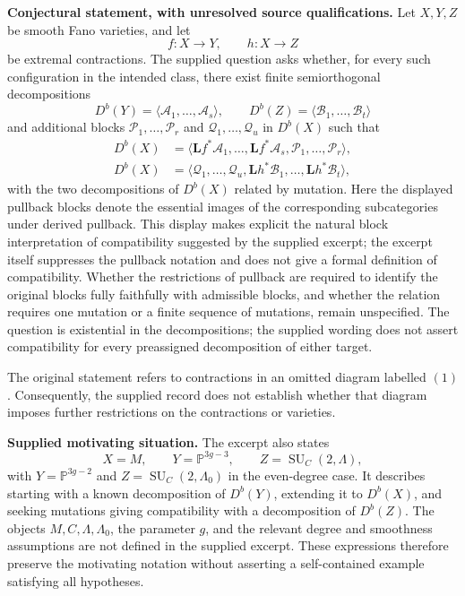 \documentclass[11pt]{article}
\begin{document}
\textbf{Conjectural statement, with unresolved source qualifications.} Let \(X,Y,Z\) be smooth Fano varieties, and let
\[
f\colon X\longrightarrow Y,
\qquad h\colon X\longrightarrow Z
\]
be extremal contractions. The supplied question asks whether, for every such configuration in the intended class, there exist finite semiorthogonal decompositions
\[
D^b(Y)=\langle\mathcal A_1,\ldots,\mathcal A_s\rangle,
\qquad
D^b(Z)=\langle\mathcal B_1,\ldots,\mathcal B_t\rangle
\]
and additional blocks \(\mathcal P_1,\ldots,\mathcal P_r\) and \(\mathcal Q_1,\ldots,\mathcal Q_u\) in \(D^b(X)\) such that
\[
\begin{aligned}
D^b(X)
&=\langle\mathbf Lf^*\mathcal A_1,\ldots,\mathbf Lf^*\mathcal A_s,
\mathcal P_1,\ldots,\mathcal P_r\rangle,\\
D^b(X)
&=\langle\mathcal Q_1,\ldots,\mathcal Q_u,
\mathbf Lh^*\mathcal B_1,\ldots,\mathbf Lh^*\mathcal B_t\rangle,
\end{aligned}
\]
with the two decompositions of \(D^b(X)\) related by mutation. Here the displayed pullback blocks denote the essential images of the corresponding subcategories under derived pullback. This display makes explicit the natural block interpretation of compatibility suggested by the supplied excerpt; the excerpt itself suppresses the pullback notation and does not give a formal definition of compatibility. Whether the restrictions of pullback are required to identify the original blocks fully faithfully with admissible blocks, and whether the relation requires one mutation or a finite sequence of mutations, remain unspecified. The question is existential in the decompositions; the supplied wording does not assert compatibility for every preassigned decomposition of either target.

The original statement refers to contractions in an omitted diagram labelled \((1)\). Consequently, the supplied record does not establish whether that diagram imposes further restrictions on the contractions or varieties.

\textbf{Supplied motivating situation.} The excerpt also states
\[
X=M,\qquad Y=\mathbb P^{3g-3},\qquad Z=\operatorname{SU}_{C}(2,\Lambda),
\]
with \(Y=\mathbb P^{3g-2}\) and \(Z=\operatorname{SU}_{C}(2,\Lambda_0)\) in the even-degree case. It describes starting with a known decomposition of \(D^b(Y)\), extending it to \(D^b(X)\), and seeking mutations giving compatibility with a decomposition of \(D^b(Z)\). The objects \(M,C,\Lambda,\Lambda_0\), the parameter \(g\), and the relevant degree and smoothness assumptions are not defined in the supplied excerpt. These expressions therefore preserve the motivating notation without asserting a self-contained example satisfying all hypotheses.
\end{document}
